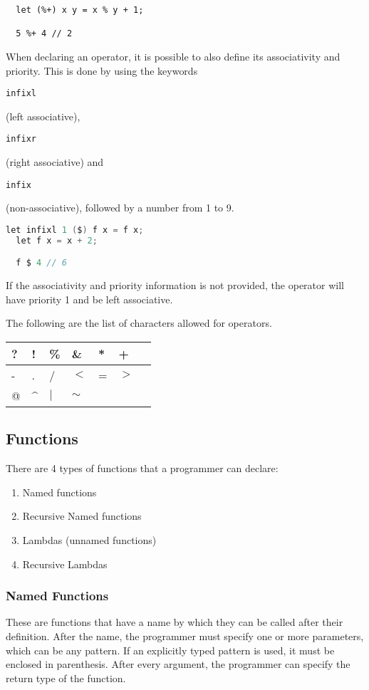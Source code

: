 \documentclass{article}
\def\code#1{\begin{footnotesize}\texttt{#1}\end{footnotesize}}
\begin{document}
\begin{lstlisting}
  let (%+) x y = x % y + 1;

  5 %+ 4 // 2
\end{lstlisting}

When declaring an operator, it is possible to also define its associativity and priority.
This is done by using the keywords \code{infixl} (left associative), \code{infixr} (right associative) and \code{infix} (non-associative), followed by a number from 1 to 9.

\begin{lstlisting}[language=V]
  let infixl 1 ($) f x = f x;
  let f x = x + 2;

  f $ 4 // 6
\end{lstlisting}

If the associativity and priority information is not provided, the operator will have priority 1 and be left associative.

The following are the list of characters allowed for operators.

\smallskip

\begin{tabular}{|l|l|l|l|l|l|l|}
  \hline
  ? & ! & \% & \& & * & +\\
  \hline
  - & . & / & $<$ & = & $>$\\
  \hline
  @ & \textasciicircum & $|$ & $\sim$\\
  \hline
\end{tabular}

\subsection{Functions}

There are 4 types of functions that a programmer can declare:

\begin{enumerate}
  \item Named functions
  \item Recursive Named functions
  \item Lambdas (unnamed functions)
  \item Recursive Lambdas
\end{enumerate}

\subsubsection{Named Functions}

These are functions that have a name by which they can be called after their definition.
After the name, the programmer must specify one or more parameters, which can be any pattern.
If an explicitly typed pattern is used, it must be enclosed in parenthesis.
After every argument, the programmer can specify the return type of the function.
\end{document}
